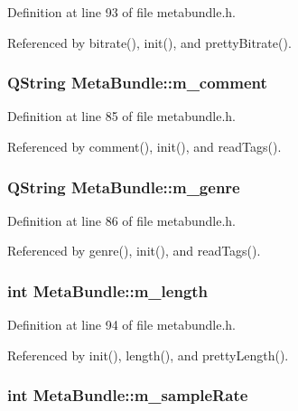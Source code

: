 Definition at line 93 of file metabundle.h.

Referenced by bitrate(), init(), and pretty\-Bitrate().
\subsubsection{\setlength{\rightskip}{0pt plus 5cm}QString {\bf Meta\-Bundle::m\_\-comment}\hspace{0.3cm}{\tt  [private]}}\label{classMetaBundle_MetaBundler5}




Definition at line 85 of file metabundle.h.

Referenced by comment(), init(), and read\-Tags().
\subsubsection{\setlength{\rightskip}{0pt plus 5cm}QString {\bf Meta\-Bundle::m\_\-genre}\hspace{0.3cm}{\tt  [private]}}\label{classMetaBundle_MetaBundler6}




Definition at line 86 of file metabundle.h.

Referenced by genre(), init(), and read\-Tags().
\subsubsection{\setlength{\rightskip}{0pt plus 5cm}int {\bf Meta\-Bundle::m\_\-length}\hspace{0.3cm}{\tt  [private]}}\label{classMetaBundle_MetaBundler9}




Definition at line 94 of file metabundle.h.

Referenced by init(), length(), and pretty\-Length().
\subsubsection{\setlength{\rightskip}{0pt plus 5cm}int {\bf Meta\-Bundle::m\_\-sample\-Rate}\hspace{0.3cm}{\tt  [private]}}\label{classMetaBundle_MetaBundler10}




